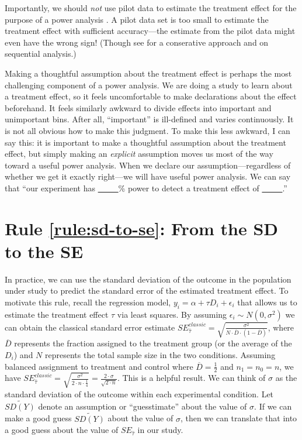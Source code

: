 \documentclass[12pt]{article}
\begin{document}
Importantly, we should \textit{not} use pilot data to estimate the treatment effect for the purpose of a power analysis \citep{Leon2011, Albers2018}.
A pilot data set is too small to estimate the treatment effect with sufficient accuracy---the estimate from the pilot data might even have the wrong sign! (Though see \citet{Perugini2014} for a conserative approach and \cite{Lakens2014} on sequential analysis.)

Making a thoughtful assumption about the treatment effect is perhaps the most challenging component of a power analysis. 
We are doing a study to learn about a treatment effect, so it feels uncomfortable to make declarations about the effect beforehand. 
It feels similarly awkward to divide effects into important and unimportant bins. 
After all, ``important'' is ill-defined and varies continuously. It is not all obvious how to make this judgment. 
To make this less awkward, I can say this: it is important to make a thoughtful assumption about the treatment effect, but simply making an  \emph{explicit} assumption moves us most of the way toward a useful power analysis. 
When we declare our assumption---regardless of whether we get it exactly right---we will have useful power analysis. 
We can say that ``our experiment has \underline{~~~~~}\% power to detect a treatment effect of \underline{~~~~~}.''

\section*{Rule \ref{rule:sd-to-se}: From the SD to the SE}

In practice, we can use the standard deviation of the outcome in the population under study to predict the standard error of the estimated treatment effect. 
To motivate this rule, recall the regression model, $y_{i} = \alpha + \tau D_{i} + \epsilon_{i}$ that allows us to estimate the treatment effect $\tau$ via least squares. 
By assuming $\epsilon_{i} \sim N\left( 0,\sigma^{2} \right)$ we can obtain the classical standard error estimate $SE_{\widehat{\tau}}^{classic} = \sqrt{\frac{\sigma^{2}}{N \cdot \overline{D} \cdot \left( 1 - \overline{D} \right)}}$, where $\overline{D}$ represents the fraction assigned to the treatment group (or the average of the $D_{i}$) and $N$ represents the total sample size in the two conditions. 
Assuming balanced assignment to treatment and control where $\overline{D} = \frac{1}{2}$ and $n_{1} = n_{0} = n$, we have $SE_{\widehat{\tau}}^{classic} = \sqrt{\frac{\sigma^{2}}{2 \cdot n \cdot \frac{1}{4}}} = \frac{2 \cdot \sigma}{\sqrt{2 \cdot n}}$.
This is a helpful result. 
We can think of $\sigma$ as the standard deviation of the outcome within each experimental condition. 
Let $\widetilde{SD(Y)}$ denote an assumption or ``guesstimate'' about the value of $\sigma$. 
If we can make a good guess $\widetilde{SD(Y)}$ about the value of $\sigma$, then we can translate that into a good guess about the value of $SE_{\widehat{\tau}}$ in our study.
\end{document}
